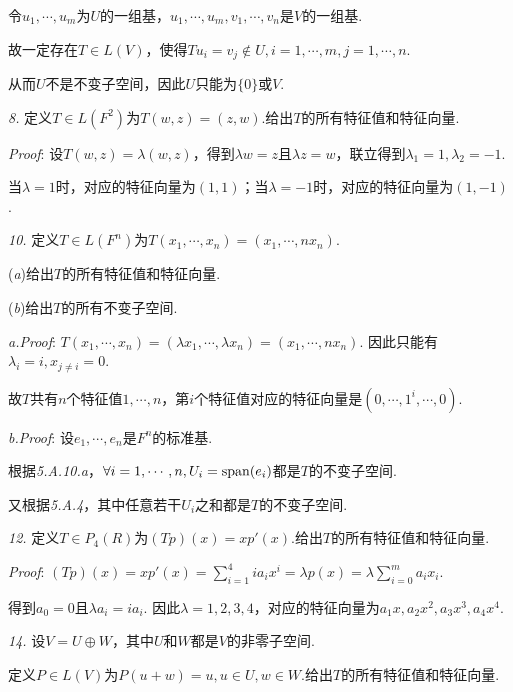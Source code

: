 令\(u_1,\cdots,u_m\)为\(U\)的一组基，\(u_1,\cdots,u_m,v_1,\cdots,v_n\)是\(V\)的一组基.

故一定存在\(T \in L(V)\)，使得\(Tu_i=v_j \notin U,i=1,\cdots,m,j=1,\cdots,n\).

从而\(U\)不是不变子空间，因此\(U\)只能为\(\{0\}\)或\(V\).

\hspace*{\fill}

\textit{8.}
定义\(T \in L(F^2)\)为\(T(w,z)=(z,w)\).给出\(T\)的所有特征值和特征向量.

\textit{Proof}:
设\(T(w,z)=\lambda(w,z)\)，得到\(\lambda w=z\)且\(\lambda z=w\)，联立得到\(\lambda_1=1,\lambda_2=-1\).

当\(\lambda=1\)时，对应的特征向量为\((1,1)\)；当\(\lambda=-1\)时，对应的特征向量为\((1,-1)\).

\newpage

\textit{10.}
定义\(T \in L(F^n)\)为\(T(x_1,\cdots,x_n)=(x_1,\cdots,nx_n)\).

(\textit{a})给出\(T\)的所有特征值和特征向量.

(\textit{b})给出\(T\)的所有不变子空间.

\textit{a.Proof}:
\(T(x_1,\cdots,x_n)=(\lambda x_1,\cdots,\lambda x_n)=(x_1,\cdots,nx_n)\).
因此只能有\(\lambda_i=i,x_{j \ne i}=0\).

故\(T\)共有\(n\)个特征值\(1,\cdots,n\)，第\(i\)个特征值对应的特征向量是\((0,\cdots,1^i,\cdots,0)\).

\textit{b.Proof}:
设\(e_1,\cdots,e_n\)是\(F^n\)的标准基.

根据\textit{5.A.10.a}，\(\forall i=1,\cdots,n,U_i=\mathrm{span} (e_i)\)都是\(T\)的不变子空间.

又根据\textit{5.A.4}，其中任意若干\(U_i\)之和都是\(T\)的不变子空间.

\hspace*{\fill}

\textit{12.}
定义\(T \in P_4(R)\)为\((Tp)(x)=xp'(x)\).给出\(T\)的所有特征值和特征向量.

\textit{Proof}:
\((Tp)(x)=xp'(x)=\sum_{i=1}^4 ia_ix^i=\lambda p(x)=\lambda \sum_{i=0}^m a_ix_i\).

得到\(a_0=0\)且\(\lambda a_i=i a_i\).
因此\(\lambda=1,2,3,4\)，对应的特征向量为\(a_1x,a_2x^2,a_3x^3,a_4x^4\).

\hspace*{\fill}

\textit{14.}
设\(V=U \oplus W\)，其中\(U\)和\(W\)都是\(V\)的非零子空间.

定义\(P \in L(V)\)为\(P(u+w)=u,u \in U,w \in W\).给出\(T\)的所有特征值和特征向量.

